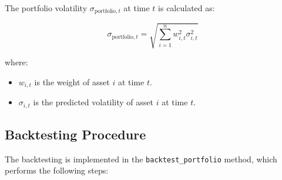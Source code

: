 The portfolio volatility \( \sigma_{\text{portfolio}, t} \) at time \( t \) is calculated as:

\[
\sigma_{\text{portfolio}, t} = \sqrt{\sum_{i=1}^n w_{i, t}^2 \sigma_{i, t}^2}
\]

where:

\begin{itemize}
    \item \( w_{i, t} \) is the weight of asset \( i \) at time \( t \).
    \item \( \sigma_{i, t} \) is the predicted volatility of asset \( i \) at time \( t \).
\end{itemize}

\subsection{Backtesting Procedure}

The backtesting is implemented in the \texttt{backtest\_portfolio} method, which performs the following steps:


